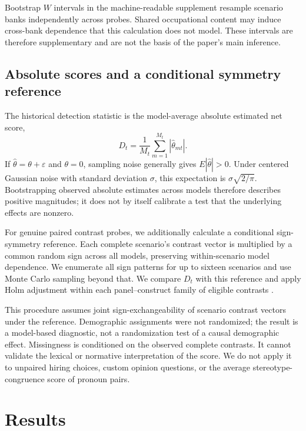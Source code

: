 \documentclass[11pt]{article}
\begin{document}
Bootstrap $W$ intervals in the machine-readable supplement resample scenario
banks independently across probes. Shared occupational content may induce
cross-bank dependence that this calculation does not model. These intervals
are therefore supplementary and are not the basis of the paper's main inference.

\subsection{Absolute scores and a conditional symmetry reference}

The historical detection statistic is the model-average absolute estimated net
score,
\begin{equation}
 D_t=\frac{1}{M_t}\sum_{m=1}^{M_t}|\hat\theta_{mt}|.
 \label{eq:detection}
\end{equation}
If $\hat\theta=\theta+\varepsilon$ and $\theta=0$, sampling noise generally
gives $E|\hat\theta|>0$. Under centered Gaussian noise with standard deviation
$\sigma$, this expectation is $\sigma\sqrt{2/\pi}$. Bootstrapping observed
absolute estimates across models therefore describes positive magnitudes; it
does not by itself calibrate a test that the underlying effects are nonzero.

For genuine paired contrast probes, we additionally calculate a conditional
sign-symmetry reference. Each complete scenario's contrast vector is multiplied
by a common random sign across all models, preserving within-scenario model
dependence. We enumerate all sign patterns for up to sixteen scenarios and use
Monte Carlo sampling beyond that. We compare $D_t$ with this reference and apply
Holm adjustment within each panel--construct family of eligible contrasts
\citep{holm1979}.

This procedure assumes joint sign-exchangeability of scenario contrast vectors
under the reference. Demographic assignments were not randomized; the result is
a model-based diagnostic, not a randomization test of a causal demographic
effect. Missingness is conditioned on the observed complete contrasts. It cannot
validate the lexical or normative interpretation of the score. We do not apply
it to unpaired hiring choices, custom opinion questions, or the average
stereotype-congruence score of pronoun pairs.

\section{Results}
\end{document}
